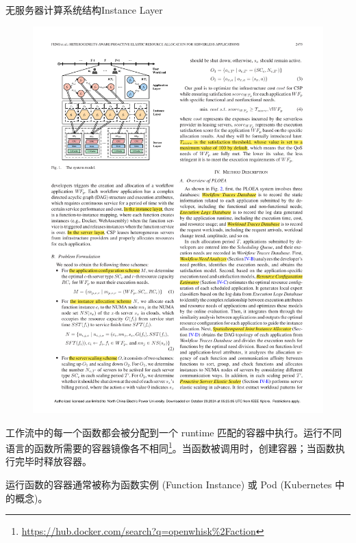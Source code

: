 \documentclass[aspectratio=169]{beamer}
\begin{document}
\begin{frame}{无服务器计算系统结构}{Instance Layer}
  \begin{figure}
    \centering
    \includegraphics[height=0.5\textheight]{img/serverless-system-architecture/system-model-instance.pdf}
  \end{figure}

  工作流中的每一个函数都会被分配到一个 runtime 匹配的容器中执行。运行不同语言的函数所需要的容器镜像各不相同\footnote{\url{https://hub.docker.com/search?q=openwhisk\%2Faction}}。当函数被调用时，创建容器；当函数执行完毕时释放容器。

  运行函数的容器通常被称为函数实例 (Function Instance) 或 Pod (Kubernetes 中的概念)。
\end{frame}
\end{document}
